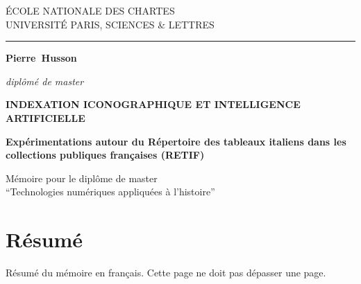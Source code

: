 \documentclass[12pt,twoside]{book}
\author{\PrenomAuteur \textsc{\NomAuteur} - M2 TNAH}
\title{\TitreMemoire}
\newcommand{\PrenomAuteur}{Pierre}
\newcommand{\NomAuteur}{Husson}
\newcommand{\Auteur}{\PrenomAuteur\ \NomAuteur}
\newcommand{\TitreMemoire}{Indexation iconographique et intelligence artificielle}
\newcommand{\SousTitreMemoire}{Expérimentations autour du Répertoire des tableaux italiens dans les collections publiques françaises (RETIF)}
\begin{document}
	\begin{titlepage}
		\begin{center}
			
			\bigskip
			
			\begin{large}				
				ÉCOLE NATIONALE DES CHARTES\\
				UNIVERSITÉ PARIS, SCIENCES \& LETTRES
			\end{large}
			\begin{center}\rule{2cm}{0.02cm}\end{center}
			
			\bigskip
			\bigskip
			\bigskip
			\begin{Large}
				\textbf{\Auteur}\\
			\end{Large}
			\begin{normalsize}
				\textit{diplômé de master}
			\end{normalsize}
			
			\bigskip
			\bigskip
			\bigskip
			
			\begin{Huge}
				\textbf{\MakeUppercase{\TitreMemoire}}\\
			\end{Huge}
			\bigskip
			\bigskip
			\begin{LARGE}
				\textbf{\SousTitreMemoire}\\
			\end{LARGE}
			
			\bigskip
			\bigskip
			\bigskip
			\begin{large}
			\end{large}
			\vfill
			
			\begin{large}
				Mémoire 
				pour le diplôme de master \\
				\enquote{Technologies numériques appliquées à l'histoire} \\
			\end{large}
			
		\end{center}
	\end{titlepage}

	\thispagestyle{empty}	
	\cleardoublepage
	
\frontmatter

	\chapter{Résumé}
\medskip
	Résumé du mémoire en français. Cette page ne doit pas dépasser une page.\\
	
\end{document}
